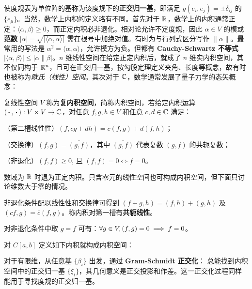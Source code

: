 使度规表为单位阵的基称为该度规下的\textbf{正交归一基}，即满足 $g(e_i,e_j)=\pm\delta_{ij}$ 的$\{e_{\mu}\}$。当然，数学上内积的定义略有不同。首先对于 $\mathbb{R}$，数学上的内积通常正定：$\langle\alpha,\beta\rangle\geqslant0$，而正定内积必非退化。相对论允许不定度规，因此 $\alpha \in V$ 的模或\textbf{范数} $|\alpha|=\sqrt{|\langle\alpha, \alpha\rangle|}$ 需在根号中加绝对值。有时为与行列式区分写作 $\|\alpha\|$。最常用的写法是 $\alpha^2=\langle\alpha, \alpha\rangle$，允许模方为负。但都有 \textbf{Cauchy-Schwartz 不等式} $|\langle\alpha, \beta\rangle| \leqslant|\alpha \| \beta|$。$n$ 维线性空间在给定正定内积后，就成了 $n$ 维实内积空间，其不仅同构于 $\mathbb{R}^n$，且可在正交归一基，按勾股定理定义夹角、长度等概念，故有时也被称为\textit{欧氏（线性）空间}。其次对于 $\mathbb{C}$，数学通常发展了量子力学的态矢概念：
\begin{definition}
    复线性空间 $V$ 称为\textbf{复内积空间}，简称内积空间，若给定内积运算 $(\oo, \oo): V \times V \rightarrow \C$，对任意 $f, g, h \in V$ 和任意 $c,d \in \mathbb{C}$ 满足：
    
    （第二槽线性性）$(f, cg+dh)=c(f, g)+d(f, h)$；
    
    （交换律）$(f, g)=\overline{(g, f)}$，其中 $\overline{(g, f)}$ 代表复数 $(g, f)$ 的共轭复数；
    
    （非退化）$(f, f) \geqslant 0$, 且 $(f, f)=0 \Leftrightarrow f=0$。
    \end{definition}
    \begin{remark}
        数域为 $\mathbb{R}$ 时退为正定内积。只含零元的线性空间也可构成内积空间，但下面只讨论维数大于零的情况。
    \end{remark}
    \begin{theorem}
    非退化条件配以线性性和交换律可得到 $(f+g, h)=(f, h)+(g, h)$ 及 $(c f, g)=\bar{c}(f, g)$。称内积对第一槽有\textbf{共轭线性}。
    \end{theorem}
    \begin{theorem}
    对非退化条件中取 $g=f$ 可有：$\forall g\in V,(f,g)=0\implies f=0$。
    \end{theorem}
    \begin{eg}
        对 $C[a, b]$ 定义如下内积就构成内积空间：
\end{eg}

对于有限维，从任意基 $\{\beta_i\}$ 出发，通过 \textbf{Gram-Schmidt 正交化}：
总能找到内积空间中的正交归一基 $\{\xi_i\}$，其几何意义是正交投影和作差。这一正交化过程同样能用于寻找度规的正交归一基。

